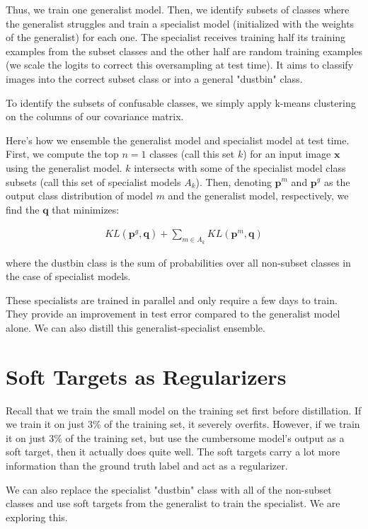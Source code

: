 \documentclass[a4paper]{article}
\begin{document}
Thus, we train one generalist model. Then, we identify subsets of classes where
the generalist struggles and train a specialist model (initialized with the
weights of the generalist) for each one. The specialist receives training half
its training examples from the subset classes and the other half are random
training examples (we scale the logits to correct this oversampling at test
time). It aims to classify images into the correct subset class or
into a general "dustbin" class.

To identify the subsets of confusable classes, we simply apply k-means
clustering on the columns of our covariance matrix.

Here's how we ensemble the generalist model and specialist model at test time.
First, we compute the top $n = 1$ classes (call this set $k$) for an input image
$\mathbf{x}$ using the generalist model. $k$ intersects with some of the
specialist model class subsets (call this set of specialist models $A_k$). Then,
denoting $\mathbf{p}^m$ and $\mathbf{p}^g$ as the output class distribution of
model $m$ and the generalist model, respectively, we find the $\mathbf{q}$ that
minimizes:

\begin{align}
  KL(\mathbf{p}^g, \mathbf{q}) + \sum_{m \in A_k}{KL(\mathbf{p}^m, \mathbf{q})}
\end{align}

where the dustbin class is the sum of probabilities over all non-subset
classes in the case of specialist models.

These specialists are trained in parallel and only require a few days to
train. They provide an improvement in test error compared to the generalist
model alone. We can also distill this generalist-specialist ensemble.

\section{Soft Targets as Regularizers}
Recall that we train the small model on the training set first before
distillation. If we train it on just 3\% of the training set, it severely
overfits. However, if we train it on just 3\% of the training set, but use
the cumbersome model's output as a soft target, then it actually does quite
well. The soft targets carry a lot more information than the ground truth
label and act as a regularizer.

We can also replace the specialist "dustbin" class with all of the non-subset
classes and use soft targets from the generalist to train the specialist. We
are exploring this.
\end{document}
